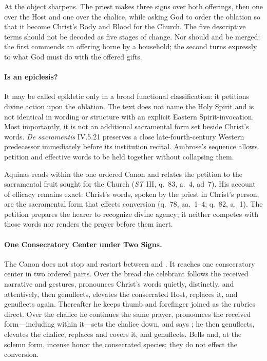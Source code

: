 At  the object sharpens. The priest makes three signs over both offerings, then one over the Host and one over the chalice, while asking God to order the oblation so that it become Christ's Body and Blood for the Church. The five descriptive terms should not be decoded as five stages of change. Nor should  and  be merged: the first commends an offering borne by a household; the second turns expressly to what God must do with the offered gifts.

\paragraph{Is  an epiclesis?}
It may be called epikletic only in a broad functional classification: it petitions divine action upon the oblation. The text does not name the Holy Spirit and is not identical in wording or structure with an explicit Eastern Spirit-invocation. Most importantly, it is not an additional sacramental form set beside Christ's words. \emph{De sacramentis} IV.5.21 preserves a close late-fourth-century Western predecessor immediately before its institution recital. Ambrose's sequence allows petition and effective words to be held together without collapsing them.

Aquinas reads  within the one ordered Canon and relates the petition to the sacramental fruit sought for the Church (\emph{ST} III, q.~83, a.~4, ad~7). His account of efficacy remains exact: Christ's words, spoken by the priest in Christ's person, are the sacramental form that effects conversion (q.~78, aa.~1--4; q.~82, a.~1). The petition prepares the hearer to recognize divine agency; it neither competes with those words nor renders the prayer before them inert.

\paragraph{One Consecratory Center under Two Signs.}

The Canon does not stop and restart between  and . It reaches one consecratory center in two ordered parts. Over the bread the celebrant follows the received narrative and gestures, pronounces Christ's words quietly, distinctly, and attentively, then genuflects, elevates the consecrated Host, replaces it, and genuflects again. Thereafter he keeps thumb and forefinger joined as the rubrics direct. Over the chalice he continues the same prayer, pronounces the received form---including  within it---sets the chalice down, and says ; he then genuflects, elevates the chalice, replaces and covers it, and genuflects. Bells and, at the solemn form, incense honor the consecrated species; they do not effect the conversion.

